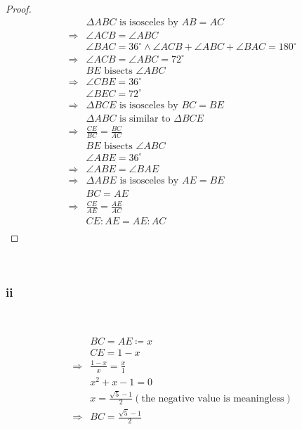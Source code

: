 \documentclass{article}
\begin{document}
\begin{proof}
    \begin{align*}
        &\Delta ABC\text{ is isosceles by }AB=AC\\
        \Rightarrow&\angle ACB=\angle ABC\\
        &\angle BAC=36^\circ\land \angle ACB+\angle ABC+\angle BAC=180^\circ\\
        \Rightarrow&\angle ACB=\angle ABC=72^\circ\\
        &BE\text{ bisects }\angle ABC\\
        \Rightarrow& \angle CBE=36^\circ\\
        &\angle BEC=72^\circ\\
        \Rightarrow&\Delta BCE\text{ is isosceles by }BC=BE\\
        &\Delta ABC\text{ is similar to }\Delta BCE\\
        \Rightarrow&\frac{CE}{BC}=\frac{BC}{AC}\\
        &BE\text{ bisects }\angle ABC\\
        &\angle ABE=36^\circ\\
        \Rightarrow&\angle ABE=\angle BAE\\
        \Rightarrow&\Delta ABE\text{ is isosceles by }AE=BE\\
        &BC=AE\\
        \Rightarrow&\frac{CE}{AE}=\frac{AE}{AC}\\
        &CE:AE=AE:AC\\
    \end{align*}
\end{proof}

~

\subsubsection*{ii}

~

\begin{align*}
    &BC=AE\coloneqq x\\
    &CE=1-x\\
    \Rightarrow&\frac{1-x}{x}=\frac{x}{1}\\
    &x^2+x-1=0\\
    &x=\frac{\sqrt{5}-1}{2}(\text{the negative value is meaningless})\\
    \Rightarrow&BC=\frac{\sqrt{5}-1}{2}\\
\end{align*}
\end{document}

